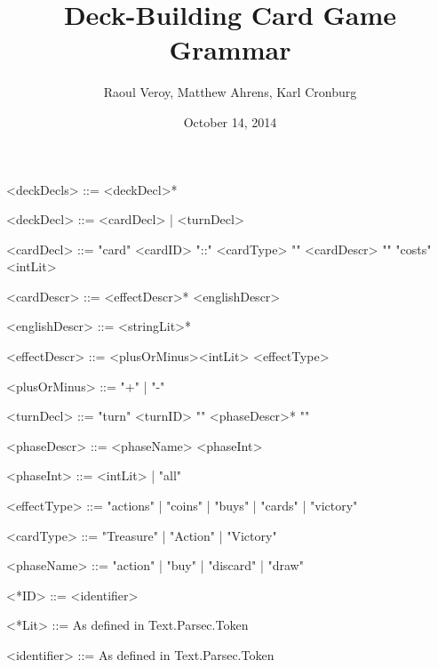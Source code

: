 \documentclass{article}
\title{Deck-Building Card Game Grammar}
\author{Raoul Veroy, Matthew Ahrens, Karl Cronburg}
\date{October 14, 2014}
\begin{document}
\maketitle
\thispagestyle{empty}

\begin{grammar}


<deckDecls>  ::= <deckDecl>*

<deckDecl>   ::= <cardDecl> | <turnDecl>


<cardDecl>    ::= "card" <cardID> "::" <cardType> "{" <cardDescr> "}" "costs" <intLit>

<cardDescr>   ::= <effectDescr>* <englishDescr>

<englishDescr> ::= <stringLit>*

<effectDescr>  ::= <plusOrMinus><intLit> <effectType>

<plusOrMinus> ::= "+" | "-"


<turnDecl>   ::= "turn" <turnID> "{" <phaseDescr>* "}"

<phaseDescr> ::= <phaseName> <phaseInt>

<phaseInt>   ::= <intLit> | "all"


<effectType>  ::= "actions"   | "coins"  | "buys" | "cards" | "victory"

<cardType>    ::= "Treasure" | "Action" | "Victory"

<phaseName>   ::= "action"   | "buy"    | "discard" | "draw"

<*ID>         ::= <identifier>

<*Lit>      ::= As defined in Text.Parsec.Token

<identifier>  ::= As defined in Text.Parsec.Token

%
%
%
%
\end{grammar}
\end{document}
